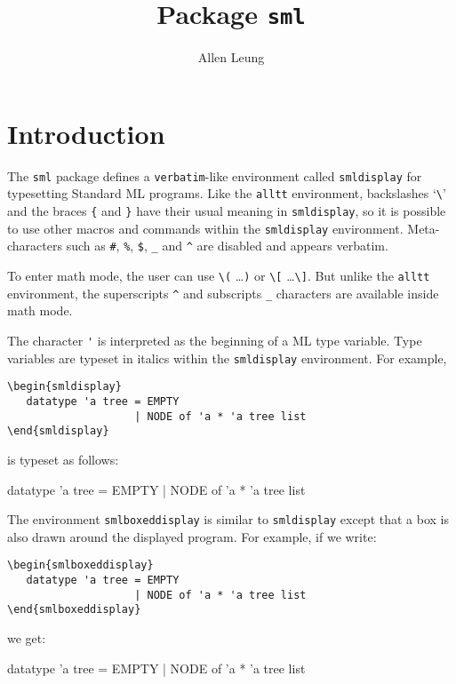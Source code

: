 \documentclass{article}
\title{Package {\tt sml}}
\author{Allen Leung}
\begin{document}
  \maketitle
\section{Introduction}
  The \verb|sml| package defines a \verb|verbatim|-like environment
called \verb|smldisplay|
for typesetting Standard ML programs.   
Like the \verb|alltt| environment, 
backslashes `\verb|\|' and the braces \verb|{|
and \verb|}| have their usual meaning in \verb|smldisplay|, 
so it is possible to use other
macros and commands within the \verb|smldisplay| environment.
Meta-characters such as \verb|#|, \verb|%|, 
\verb|$|, \verb|_| and \verb|^| are disabled and appears verbatim.  

To enter math mode, the user can use \verb|\(| \ldots \verb|)| or
\verb|\[| \ldots \verb|\]|.  But unlike the \verb|alltt| environment,
the superscripts \verb|^| and subscripts \verb|_| characters
are available inside math mode. 

The character \verb|'| is interpreted as the beginning of a ML 
type variable.  Type variables are typeset 
in italics within the \verb|smldisplay| environment.  For example, 
\begin{verbatim}
\begin{smldisplay} 
   datatype 'a tree = EMPTY
                    | NODE of 'a * 'a tree list
\end{smldisplay}
\end{verbatim}
is typeset as follows:
\begin{smldisplay} 
   datatype 'a tree = EMPTY 
                    | NODE of 'a * 'a tree list
\end{smldisplay}

The environment \verb|smlboxeddisplay| is similar to \verb|smldisplay|
except that a box is also drawn around the displayed program.
For example, if we write:
\begin{verbatim}
\begin{smlboxeddisplay} 
   datatype 'a tree = EMPTY 
                    | NODE of 'a * 'a tree list
\end{smlboxeddisplay}
\end{verbatim}
we get:
\begin{smlboxeddisplay} 
   datatype 'a tree = EMPTY 
                    | NODE of 'a * 'a tree list
\end{smlboxeddisplay}
\end{document}
